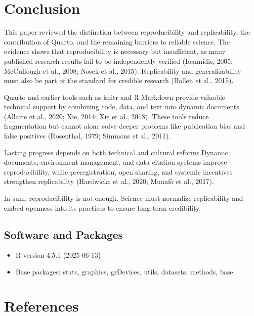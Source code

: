 \documentclass[
  a4paper,
]{article}
\providecommand{\tightlist}{%
  \setlength{\itemsep}{0pt}\setlength{\parskip}{0pt}}\usepackage{longtable,booktabs,array}
\begin{document}
\section{Conclusion}\label{conclusion}

This paper reviewed the distinction between reproducibility and
replicability, the contribution of Quarto, and the remaining barriers to
reliable science. The evidence shows that reproducibility is necessary
but insufficient, as many published research results fail to be
independently verified (Ioannidis, 2005; McCullough et al., 2008; Nosek
et al., 2015). Replicability and generalizability must also be part of
the standard for credible research (Bollen et al., 2015).

Quarto and earlier tools such as knitr and R Markdown provide valuable
technical support by combining code, data, and text into dynamic
documents (Allaire et al., 2020; Xie, 2014; Xie et al., 2018). These
tools reduce fragmentation but cannot alone solve deeper problems like
publication bias and false positives (Rosenthal, 1979; Simmons et al.,
2011).

Lasting progress depends on both technical and cultural reforms.Dynamic
documents, environment management, and data citation systems improve
reproducibility, while preregistration, open sharing, and systemic
incentives strengthen replicability (Hardwicke et al., 2020; Munafò et
al., 2017).

In sum, reproducibility is not enough. Science must normalize
replicability and embed openness into its practices to ensure long-term
credibility.

\subsection{Software and Packages}\label{software-and-packages}

\begin{itemize}
\tightlist
\item
  R version 4.5.1 (2025-06-13)\\
\item
  Base packages: stats, graphics, grDevices, utils, datasets, methods,
  base
\end{itemize}

\section*{References}\label{references}
\end{document}
